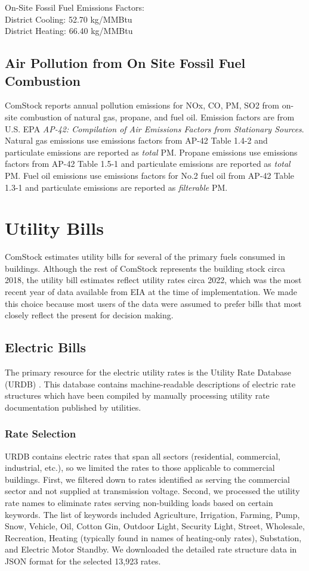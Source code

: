 On-Site Fossil Fuel Emissions Factors:\\
District Cooling: 52.70 kg/MMBtu\\
District Heating: 66.40 kg/MMBtu\\

\subsection{Air Pollution from On Site Fossil Fuel Combustion}
ComStock reports annual pollution emissions for NOx, CO, PM, SO2 from on-site combustion of natural gas, propane, and fuel oil. Emission factors are from U.S. EPA \textit{AP-42: Compilation of Air Emissions Factors from Stationary Sources}\citep{epa_ap42}. Natural gas emissions use emissions factors from AP-42 Table 1.4-2 and particulate emissions are reported as \textit{total} PM. Propane emissions use emissions factors from AP-42 Table 1.5-1 and particulate emissions are reported as \textit{total} PM. Fuel oil emissions use emissions factors for No.2 fuel oil from AP-42 Table 1.3-1 and particulate emissions are reported as \textit{filterable} PM.

\section{Utility Bills}
ComStock estimates utility bills for several of the primary fuels consumed in buildings.
Although the rest of ComStock represents the building stock circa 2018, the utility bill estimates reflect utility rates
circa 2022, which was the most recent year of data available from EIA at the time of implementation. We made this choice
because most users of the data were assumed to prefer bills that most closely reflect the present for decision making.

\subsection{Electric Bills}
The primary resource for the electric utility rates is the Utility Rate Database (URDB) \citep{urdb}. This database contains machine-readable descriptions of electric rate structures which have been compiled by manually processing utility rate documentation published by utilities.

\subsubsection{Rate Selection}
URDB contains electric rates that span all sectors (residential, commercial, industrial, etc.), so we limited the rates to those applicable to commercial buildings. First, we filtered down to rates identified as serving the commercial sector and not supplied at transmission voltage. Second, we processed the utility rate names to eliminate rates serving non-building loads based on certain keywords. The list of keywords included Agriculture, Irrigation, Farming, Pump, Snow, Vehicle, Oil, Cotton Gin, Outdoor Light, Security Light, Street, Wholesale, Recreation, Heating (typically found in names of heating-only rates), Substation, and Electric Motor Standby. We downloaded the detailed rate structure data in JSON format for the selected 13,923 rates.

